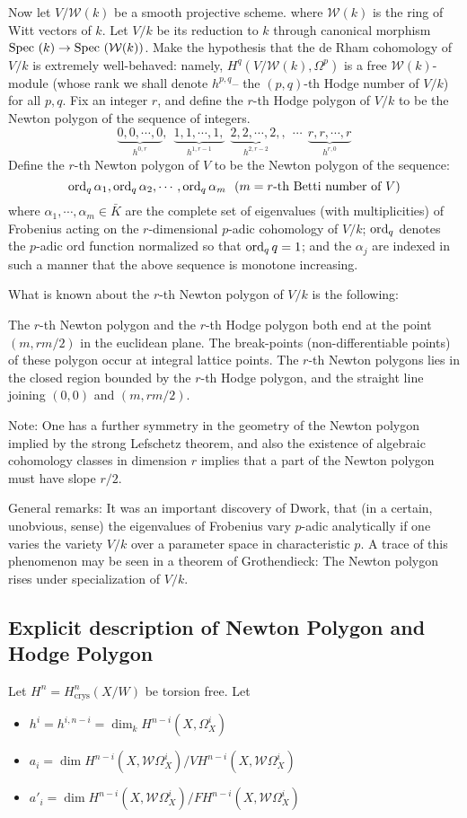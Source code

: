 	Now let $V/\mathcal{W}(k)$ be a smooth projective scheme. where $\mathcal{W}(k)$ is the ring of Witt vectors of $k$. Let $V/k$ be its reduction to $k$ through canonical morphism $ \text{Spec } (k) \to \text{Spec }(\mathcal{W}(k))$. Make the hypothesis that the de Rham cohomology of $V/k$ is extremely well-behaved: namely, $H^q(V/\mathcal{W}(k), \Omega^p)$ is a free $\mathcal{W}(k)$-module (whose rank we shall denote $h^{p,q}$-- the $(p,q)$-th Hodge number of $V/k$) for all $p,q$. Fix an integer $r$, and define the $r$-th Hodge polygon of $V/k$ to be the Newton polygon of the sequence of integers. 
	\[
	\underbrace{0,0,\cdots,0}_{h^{0,r}}, \ \ \underbrace{1,1,\cdots,1,}_{h^{1,r-1}}\ \ \underbrace{2,2,\cdots,2,}_{h^{2,r-2}},\ \ \cdots\ \ \underbrace{r,r,\cdots, r}_{h^{r,0}} 
	\]
	 Define the $r$-th Newton polygon of $V$ to be the Newton polygon of the sequence:
	 \[
	 \operatorname{ord}_q \alpha_1, \operatorname{ord}_q \alpha_2, \cdots, \operatorname{ord}_q \alpha_m\ \ (m= r\text{-th Betti number of  }V)
	 \]
	 where $\alpha_1, \cdots, \alpha_m \in \bar{K}$ are the complete set of eigenvalues (with multiplicities) of Frobenius acting on the $r$-dimensional $p$-adic cohomology of $V/k$; $\operatorname{ord}_q$ denotes the $p$-adic ord function normalized so that $\operatorname{ord}_q q =1$; and the $\alpha_j$ are indexed in such a manner that the above sequence is monotone increasing.
	 
	 What is known about the $r$-th Newton polygon of $V/k$ is the following:
	 
	 The $r$-th Newton polygon and the $r$-th Hodge polygon both end at the point $(m,rm/2)$ in the euclidean plane. The break-points (non-differentiable points) of these polygon occur at integral lattice points. The $r$-th Newton polygons lies in the closed region bounded by the $r$-th Hodge polygon, and the straight line joining $(0,0)$ and $(m,rm/2)$.
	 
	 Note: One has a further symmetry in the geometry of the Newton polygon implied by the strong Lefschetz theorem, and also the existence of algebraic cohomology classes in dimension $r$ implies that a part of the Newton polygon must have slope $r/2$.
	 
	 General remarks: It was an important discovery of Dwork, that (in a certain, unobvious, sense) the eigenvalues of Frobenius vary $p$-adic analytically if one varies the variety $V/k$ over a parameter space in characteristic $p$. A trace of this phenomenon may be seen in a theorem of Grothendieck: The Newton polygon rises under specialization of $V/k$.
	 
\subsection{Explicit description of Newton Polygon and Hodge Polygon}
Let $H^n = H^n_{\text{crys}}(X/W)$ be torsion free.  Let 
\begin{itemize}
	\item $h^i= h^{i,n-i}= \dim_k H^{n-i}(X,\Omega_X^i)$
	\item $a_i = \dim H^{n-i}(X,\mathcal{W} \Omega_X^i)/VH^{n-i}(X, \mathcal{W}\Omega_X^i)$
	\item $a'_i = \dim H^{n-i}(X, \mathcal{W}\Omega_X^i)/F H^{n-i}(X,\mathcal{W}\Omega_X^i)$
\end{itemize}